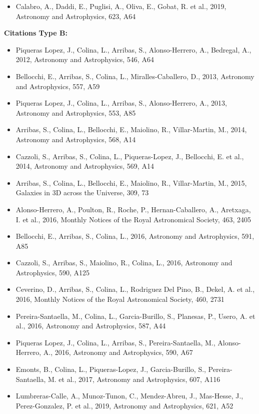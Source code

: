 \documentclass{letter}
\begin{document}
\begin{enumerate}
\begin{itemize}
\item Calabro, A., Daddi, E., Puglisi, A., Oliva, E., Gobat, R. et al., 2019, Astronomy and Astrophysics, 623, A64
\end{itemize}
{\bf Citations Type B:}
\begin{itemize}
\item Piqueras Lopez, J., Colina, L., Arribas, S., Alonso-Herrero, A., Bedregal, A., 2012, Astronomy and Astrophysics, 546, A64
\item Bellocchi, E., Arribas, S., Colina, L., Miralles-Caballero, D., 2013, Astronomy and Astrophysics, 557, A59
\item Piqueras Lopez, J., Colina, L., Arribas, S., Alonso-Herrero, A., 2013, Astronomy and Astrophysics, 553, A85
\item Arribas, S., Colina, L., Bellocchi, E., Maiolino, R., Villar-Martin, M., 2014, Astronomy and Astrophysics, 568, A14
\item Cazzoli, S., Arribas, S., Colina, L., Piqueras-Lopez, J., Bellocchi, E. et al., 2014, Astronomy and Astrophysics, 569, A14
\item Arribas, S., Colina, L., Bellocchi, E., Maiolino, R., Villar-Martin, M., 2015, Galaxies in 3D across the Universe, 309, 73
\item Alonso-Herrero, A., Poulton, R., Roche, P., Hernan-Caballero, A., Aretxaga, I. et al., 2016, Monthly Notices of the Royal Astronomical Society, 463, 2405
\item Bellocchi, E., Arribas, S., Colina, L., 2016, Astronomy and Astrophysics, 591, A85
\item Cazzoli, S., Arribas, S., Maiolino, R., Colina, L., 2016, Astronomy and Astrophysics, 590, A125
\item Ceverino, D., Arribas, S., Colina, L., Rodriguez Del Pino, B., Dekel, A. et al., 2016, Monthly Notices of the Royal Astronomical Society, 460, 2731
\item Pereira-Santaella, M., Colina, L., Garcia-Burillo, S., Planesas, P., Usero, A. et al., 2016, Astronomy and Astrophysics, 587, A44
\item Piqueras Lopez, J., Colina, L., Arribas, S., Pereira-Santaella, M., Alonso-Herrero, A., 2016, Astronomy and Astrophysics, 590, A67
\item Emonts, B., Colina, L., Piqueras-Lopez, J., Garcia-Burillo, S., Pereira-Santaella, M. et al., 2017, Astronomy and Astrophysics, 607, A116
\item Lumbreras-Calle, A., Munoz-Tunon, C., Mendez-Abreu, J., Mas-Hesse, J., Perez-Gonzalez, P. et al., 2019, Astronomy and Astrophysics, 621, A52

\end{itemize}
\end{enumerate}
\end{document}
